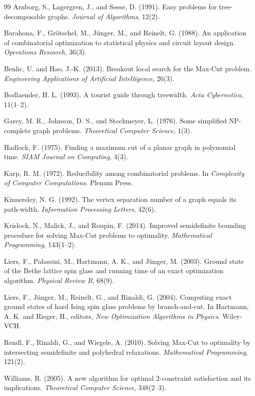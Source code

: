 \begin{thebibliography}{99}
\small
{} Arnborg, S., Lagergren, J., and Seese, D. (1991). Easy problems for tree-decomposable graphs. \emph{Journal of Algorithms}, 12(2).

 Barahona, F., Grötschel, M., Jünger, M., and Reinelt, G. (1988). An application of combinatorial optimization to statistical physics and circuit layout design. \emph{Operations Research}, 36(3).

 Benlic, U. and Hao, J.-K. (2013). Breakout local search for the Max-Cut problem. \emph{Engineering Applications of Artificial Intelligence}, 26(3).

 Bodlaender, H. L. (1993). A tourist guide through treewidth. \emph{Acta Cybernetica}, 11(1--2).

 Garey, M. R., Johnson, D. S., and Stockmeyer, L. (1976). Some simplified NP-complete graph problems. \emph{Theoretical Computer Science}, 1(3).

 Hadlock, F. (1975). Finding a maximum cut of a planar graph in polynomial time. \emph{SIAM Journal on Computing}, 4(3).

 Karp, R. M. (1972). Reducibility among combinatorial problems. In \emph{Complexity of Computer Computations}. Plenum Press.

 Kinnersley, N. G. (1992). The vertex separation number of a graph equals its path-width. \emph{Information Processing Letters}, 42(6).

 Krislock, N., Malick, J., and Roupin, F. (2014). Improved semidefinite bounding procedure for solving Max-Cut problems to optimality. \emph{Mathematical Programming}, 143(1--2).

 Liers, F., Palassini, M., Hartmann, A. K., and Jünger, M. (2003). Ground state of the Bethe lattice spin glass and running time of an exact optimization algorithm. \emph{Physical Review B}, 68(9).

 Liers, F., Jünger, M., Reinelt, G., and Rinaldi, G. (2004). Computing exact ground states of hard Ising spin glass problems by branch-and-cut. In Hartmann, A. K. and Rieger, H., editors, \emph{New Optimization Algorithms in Physics}. Wiley-VCH.

 Rendl, F., Rinaldi, G., and Wiegele, A. (2010). Solving Max-Cut to optimality by intersecting semidefinite and polyhedral relaxations. \emph{Mathematical Programming}, 121(2).

 Williams, R. (2005). A new algorithm for optimal 2-constraint satisfaction and its implications. \emph{Theoretical Computer Science}, 348(2--3).
\end{thebibliography}
